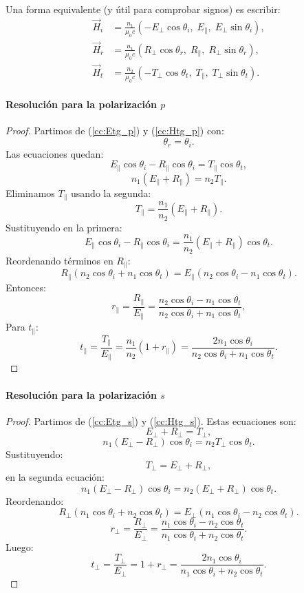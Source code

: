 \documentclass[12pt, a4paper]{article}
\theoremstyle{plain}
\theoremstyle{definition}
\theoremstyle{remark}
\newcommand{\ve}[1]{\vec{#1}}
\begin{document}
Una forma equivalente (y útil para comprobar signos) es escribir:
\begin{align*}
  \ve{H}_i &= \frac{n_1}{\mu_0 c}
    \left(-E_\perp\cos\theta_i,\; E_\parallel,\; E_\perp\sin\theta_i\right), \\
  \ve{H}_r &= \frac{n_1}{\mu_0 c}
    \left(R_\perp\cos\theta_r,\; R_\parallel,\; R_\perp\sin\theta_r\right), \\
  \ve{H}_t &= \frac{n_2}{\mu_0 c}
    \left(-T_\perp\cos\theta_t,\; T_\parallel,\; T_\perp\sin\theta_t\right).
\end{align*}

\paragraph{Resolución para la polarización $p$}

\begin{proof}
Partimos de (\ref{cc:Etg_p}) y (\ref{cc:Htg_p}) con:
\[
  \theta_r = \theta_i.
\]
Las ecuaciones quedan:
\[
  E_\parallel\cos\theta_i - R_\parallel\cos\theta_i
  = T_\parallel\cos\theta_t,
\]
\[
  n_1(E_\parallel+R_\parallel)=n_2T_\parallel.
\]
Eliminamos $T_\parallel$ usando la segunda:
\[
  T_\parallel=\frac{n_1}{n_2}(E_\parallel+R_\parallel).
\]
Sustituyendo en la primera:
\[
  E_\parallel\cos\theta_i - R_\parallel\cos\theta_i
  = \frac{n_1}{n_2}(E_\parallel+R_\parallel)\cos\theta_t.
\]
Reordenando términos en $R_\parallel$:
\[
  R_\parallel\!\left(n_2\cos\theta_i+n_1\cos\theta_t\right)
  =E_\parallel\!\left(n_2\cos\theta_i-n_1\cos\theta_t\right).
\]
Entonces:
\[
  r_\parallel = \frac{R_\parallel}{E_\parallel}
  = \frac{n_2\cos\theta_i - n_1\cos\theta_t}{n_2\cos\theta_i + n_1\cos\theta_t},
\]
Para $t_\parallel$:
\[
  t_\parallel
  =\frac{T_\parallel}{E_\parallel}
  =\frac{n_1}{n_2}\left(1+r_\parallel\right)
  =\frac{2n_1\cos\theta_i}{n_2\cos\theta_i+n_1\cos\theta_t}.
\]
\end{proof}

\paragraph{Resolución para la polarización $s$}

\begin{proof}
Partimos de (\ref{cc:Etg_s}) y (\ref{cc:Htg_s}).
Estas ecuaciones son:
\[
  E_\perp+R_\perp=T_\perp,
\]
\[
  n_1(E_\perp-R_\perp)\cos\theta_i=n_2T_\perp\cos\theta_t.
\]
Sustituyendo:
\[
  T_\perp=E_\perp+R_\perp,
\]
en la segunda ecuación:
\[
  n_1(E_\perp-R_\perp)\cos\theta_i
  =n_2(E_\perp+R_\perp)\cos\theta_t.
\]
Reordenando:
\[
  R_\perp\!\left(n_1\cos\theta_i+n_2\cos\theta_t\right)
  =E_\perp\!\left(n_1\cos\theta_i-n_2\cos\theta_t\right).
\]
\[
  r_\perp=\frac{R_\perp}{E_\perp}
  =\frac{n_1\cos\theta_i-n_2\cos\theta_t}
         {n_1\cos\theta_i+n_2\cos\theta_t}.
\]
Luego:
\[
  t_\perp = \frac{T_\perp}{E_\perp}
  = 1+r_\perp
  = \frac{2n_1\cos\theta_i}{n_1\cos\theta_i+n_2\cos\theta_t}.
\]
\end{proof}
\end{document}

